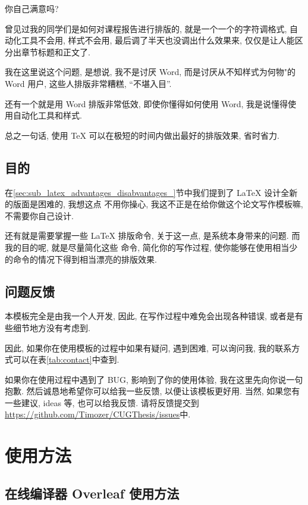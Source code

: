 \documentclass[bibsec, doctor]{cugthesis}
\begin{document}
    你自己满意吗?

    曾见过我的同学们是如何对课程报告进行排版的, 就是一个一个的字符调格式, 自动化工具不会用, 样式不会用,
    最后调了半天也没调出什么效果来, 仅仅是让人能区分出章节标题和正文了.

    我在这里说这个问题, 是想说, 我不是讨厌 Word, 而是讨厌从不知样式为何物"的 Word 用户, 这些人排版非常糟糕,
    ``不堪入目''.

    还有一个就是用 Word 排版非常低效, 即使你懂得如何使用 Word, 我是说懂得使用自动化工具和样式.

    总之一句话, 使用 \TeX{} 可以在极短的时间内做出最好的排版效果, 省时省力.

\section{目的}
\label{sec:mu_di_}
    在\ref{sec:sub_latex_advantages_disabvantages_}节中我们提到了 \LaTeX{} 设计全新的版面是困难的, 我想这点
    不用你操心, 我这不正是在给你做这个论文写作模板嘛, 不需要你自己设计.

    还有就是需要掌握一些 \LaTeX{} 排版命令, 关于这一点, 是系统本身带来的问题. 而我的目的呢, 就是尽量简化这些
    命令, 简化你的写作过程, 使你能够在使用相当少的命令的情况下得到相当漂亮的排版效果.

\section{问题反馈}
\label{sec:wen_ti_fan_kui_}
    本模板完全是由我一个人开发, 因此, 在写作过程中难免会出现各种错误, 或者是有些细节地方没有考虑到.

    因此, 如果你在使用模板的过程中如果有疑问, 遇到困难, 可以询问我, 我的联系方式可以在表\ref{tab:contact}中查到.
    
    如果你在使用过程中遇到了 BUG, 影响到了你的使用体验, 我在这里先向你说一句抱歉.
    然后诚恳地希望你可以给我一些反馈, 以便让该模板更好用. 当然, 如果您有一些建议, ideas 等, 也可以给我反馈. 
    请将反馈提交到
    \url{https://github.com/Timozer/CUGThesis/issues}中.


\chapter{使用方法}

\section{在线编译器 Overleaf 使用方法}
\label{sec:overleaf_usage}
\end{document}
